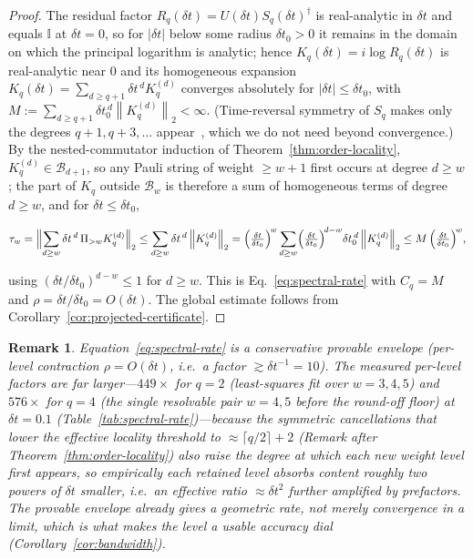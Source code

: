 \documentclass[aps,prresearch,reprint,superscriptaddress,nofootinbib,amsmath,amssymb]{revtex4-2}
\newcommand{\norm}[1]{\left\lVert #1 \right\rVert}
\newcommand{\abs}[1]{\left\lvert #1 \right\rvert}
\newcommand{\id}{\mathbb{I}}
\newcommand{\cB}{\mathcal{B}}
\newcommand{\dt}{\delta t}
\newtheorem{remark}{Remark}
\begin{document}
\begin{proof}
The residual factor $R_q(\dt)=U(\dt)S_q(\dt)^\dagger$ is real-analytic in $\dt$ and equals $\id$ at $\dt=0$, so for $\abs{\dt}$ below some radius $\dt_0>0$ it remains in the domain on which the principal logarithm is analytic; hence $K_q(\dt)=i\log R_q(\dt)$ is real-analytic near $0$ and its homogeneous expansion $K_q(\dt)=\sum_{d\geq q+1}\dt^{\,d}K_q^{(d)}$ converges absolutely for $\abs{\dt}\leq\dt_0$, with $M:=\sum_{d\geq q+1}\dt_0^{\,d}\norm{K_q^{(d)}}_2<\infty$. (Time-reversal symmetry of $S_q$ makes only the degrees $q+1,q+3,\dots$ appear~\cite{blanes2009}, which we do not need beyond convergence.) By the nested-commutator induction of Theorem~\ref{thm:order-locality}, $K_q^{(d)}\in\cB_{d+1}$, so any Pauli string of weight $\geq w+1$ first occurs at degree $d\geq w$; the part of $K_q$ outside $\cB_w$ is therefore a sum of homogeneous terms of degree $d\geq w$, and for $\dt\leq\dt_0$,
\begin{widetext}
\begin{equation*}
    \tau_w=\Bigl\lVert\sum_{d\geq w}\dt^{\,d}\,\Pi_{>w}K_q^{(d)}\Bigr\rVert_2\leq\sum_{d\geq w}\dt^{\,d}\norm{K_q^{(d)}}_2=\Bigl(\tfrac{\dt}{\dt_0}\Bigr)^{\!w}\sum_{d\geq w}\Bigl(\tfrac{\dt}{\dt_0}\Bigr)^{\!d-w}\dt_0^{\,d}\norm{K_q^{(d)}}_2\leq M\,\Bigl(\tfrac{\dt}{\dt_0}\Bigr)^{\!w},
\end{equation*}
\end{widetext}
using $(\dt/\dt_0)^{d-w}\leq1$ for $d\geq w$. This is Eq.~\eqref{eq:spectral-rate} with $C_q=M$ and $\rho=\dt/\dt_0=O(\dt)$. The global estimate follows from Corollary~\ref{cor:projected-certificate}.
\end{proof}

\begin{remark}
Equation~\eqref{eq:spectral-rate} is a conservative provable envelope (per-level contraction $\rho=O(\dt)$, i.e.\ a factor $\gtrsim\dt^{-1}=10$). The measured per-level factors are far larger---$449\times$ for $q=2$ (least-squares fit over $w=3,4,5$) and $576\times$ for $q=4$ (the single resolvable pair $w=4,5$ before the round-off floor) at $\dt=0.1$ (Table~\ref{tab:spectral-rate})---because the symmetric cancellations that lower the effective locality threshold to $\approx\lceil q/2\rceil+2$ (Remark after Theorem~\ref{thm:order-locality}) also raise the degree at which each new weight level first appears, so empirically each retained level absorbs content roughly two powers of $\dt$ smaller, i.e.\ an effective ratio $\approx\dt^{2}$ further amplified by prefactors. The provable envelope already gives a geometric \emph{rate}, not merely convergence in a limit, which is what makes the level a usable accuracy dial (Corollary~\ref{cor:bandwidth}).
\end{remark}
\end{document}
